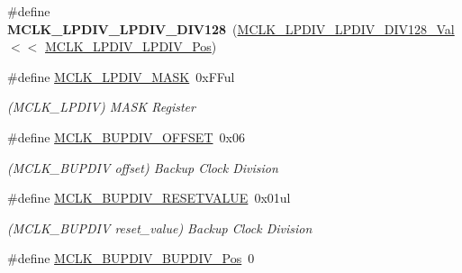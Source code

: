 \begin{DoxyCompactItemize}
\item 
\hypertarget{group___s_a_m_l21___m_c_l_k_ga56e4e157c6968e1885c44c6e7d0e9799}{}\#define {\bfseries M\+C\+L\+K\+\_\+\+L\+P\+D\+I\+V\+\_\+\+L\+P\+D\+I\+V\+\_\+\+D\+I\+V128}~(\hyperlink{group___s_a_m_l21___m_c_l_k_ga64472f172aa67a75e94939e0792f6f6e}{M\+C\+L\+K\+\_\+\+L\+P\+D\+I\+V\+\_\+\+L\+P\+D\+I\+V\+\_\+\+D\+I\+V128\+\_\+\+Val}   $<$$<$ \hyperlink{group___s_a_m_l21___m_c_l_k_gad9275e73d38bc33c74fe1d10e17e0023}{M\+C\+L\+K\+\_\+\+L\+P\+D\+I\+V\+\_\+\+L\+P\+D\+I\+V\+\_\+\+Pos})\label{group___s_a_m_l21___m_c_l_k_ga56e4e157c6968e1885c44c6e7d0e9799}

\item 
\hypertarget{group___s_a_m_l21___m_c_l_k_gade56d2279c16b5b2e8be666b0a8649d7}{}\#define \hyperlink{group___s_a_m_l21___m_c_l_k_gade56d2279c16b5b2e8be666b0a8649d7}{M\+C\+L\+K\+\_\+\+L\+P\+D\+I\+V\+\_\+\+M\+A\+S\+K}~0x\+F\+Ful\label{group___s_a_m_l21___m_c_l_k_gade56d2279c16b5b2e8be666b0a8649d7}

\begin{DoxyCompactList}\small\item\em (M\+C\+L\+K\+\_\+\+L\+P\+D\+I\+V) M\+A\+S\+K Register \end{DoxyCompactList}\item 
\hypertarget{group___s_a_m_l21___m_c_l_k_gac49ff4b000bc9c634c103d0bc6acd7b5}{}\#define \hyperlink{group___s_a_m_l21___m_c_l_k_gac49ff4b000bc9c634c103d0bc6acd7b5}{M\+C\+L\+K\+\_\+\+B\+U\+P\+D\+I\+V\+\_\+\+O\+F\+F\+S\+E\+T}~0x06\label{group___s_a_m_l21___m_c_l_k_gac49ff4b000bc9c634c103d0bc6acd7b5}

\begin{DoxyCompactList}\small\item\em (M\+C\+L\+K\+\_\+\+B\+U\+P\+D\+I\+V offset) Backup Clock Division \end{DoxyCompactList}\item 
\hypertarget{group___s_a_m_l21___m_c_l_k_gaf59a347fd28a738ba216458c47fc4972}{}\#define \hyperlink{group___s_a_m_l21___m_c_l_k_gaf59a347fd28a738ba216458c47fc4972}{M\+C\+L\+K\+\_\+\+B\+U\+P\+D\+I\+V\+\_\+\+R\+E\+S\+E\+T\+V\+A\+L\+U\+E}~0x01ul\label{group___s_a_m_l21___m_c_l_k_gaf59a347fd28a738ba216458c47fc4972}

\begin{DoxyCompactList}\small\item\em (M\+C\+L\+K\+\_\+\+B\+U\+P\+D\+I\+V reset\+\_\+value) Backup Clock Division \end{DoxyCompactList}\item 
\hypertarget{group___s_a_m_l21___m_c_l_k_ga990b49fd5adb7bbd8a9acf12cd483ae2}{}\#define \hyperlink{group___s_a_m_l21___m_c_l_k_ga990b49fd5adb7bbd8a9acf12cd483ae2}{M\+C\+L\+K\+\_\+\+B\+U\+P\+D\+I\+V\+\_\+\+B\+U\+P\+D\+I\+V\+\_\+\+Pos}~0\label{group___s_a_m_l21___m_c_l_k_ga990b49fd5adb7bbd8a9acf12cd483ae2}


\end{DoxyCompactItemize}
